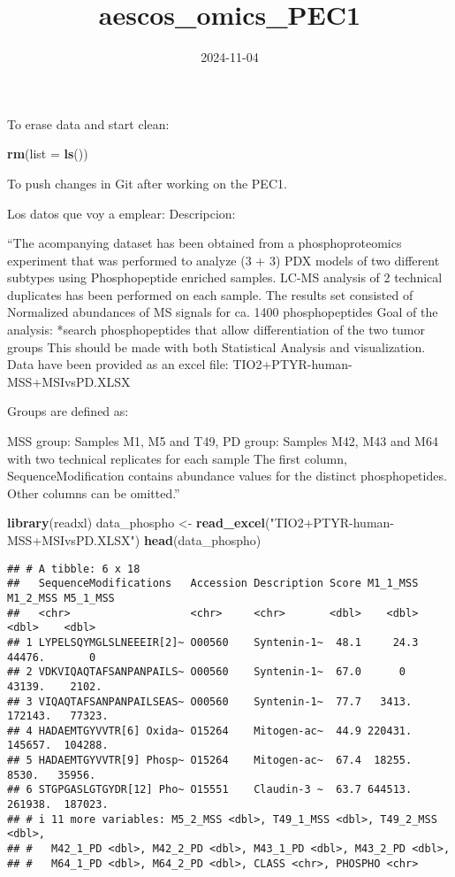 \documentclass[
]{article}
\title{aescos\_omics\_PEC1}
\author{}
\date{\vspace{-2.5em}2024-11-04}
\newenvironment{Shaded}{\begin{snugshade}}{\end{snugshade}}
\newcommand{\AttributeTok}[1]{\textcolor[rgb]{0.13,0.29,0.53}{#1}}
\newcommand{\FunctionTok}[1]{\textcolor[rgb]{0.13,0.29,0.53}{\textbf{#1}}}
\newcommand{\NormalTok}[1]{#1}
\newcommand{\OtherTok}[1]{\textcolor[rgb]{0.56,0.35,0.01}{#1}}
\newcommand{\StringTok}[1]{\textcolor[rgb]{0.31,0.60,0.02}{#1}}
\begin{document}
\maketitle

To erase data and start clean:

\begin{Shaded}
\begin{Highlighting}[]
\FunctionTok{rm}\NormalTok{(}\AttributeTok{list =} \FunctionTok{ls}\NormalTok{())}
\end{Highlighting}
\end{Shaded}

To push changes in Git after working on the PEC1.

Los datos que voy a emplear: Descripcion:

``The acompanying dataset has been obtained from a phosphoproteomics
experiment that was performed to analyze (3 + 3) PDX models of two
different subtypes using Phosphopeptide enriched samples. LC-MS analysis
of 2 technical duplicates has been performed on each sample. The results
set consisted of Normalized abundances of MS signals for ca. 1400
phosphopeptides Goal of the analysis: *search phosphopeptides that allow
differentiation of the two tumor groups This should be made with both
Statistical Analysis and visualization. Data have been provided as an
excel file: TIO2+PTYR-human-MSS+MSIvsPD.XLSX

Groups are defined as:

MSS group: Samples M1, M5 and T49, PD group: Samples M42, M43 and M64
with two technical replicates for each sample The first column,
SequenceModification contains abundance values for the distinct
phosphopetides. Other columns can be omitted.''

\begin{Shaded}
\begin{Highlighting}[]
\FunctionTok{library}\NormalTok{(readxl)}
\NormalTok{data\_phospho }\OtherTok{\textless{}{-}} \FunctionTok{read\_excel}\NormalTok{(}\StringTok{"TIO2+PTYR{-}human{-}MSS+MSIvsPD.XLSX"}\NormalTok{)}
\FunctionTok{head}\NormalTok{(data\_phospho)}
\end{Highlighting}
\end{Shaded}

\begin{verbatim}
## # A tibble: 6 x 18
##   SequenceModifications   Accession Description Score M1_1_MSS M1_2_MSS M5_1_MSS
##   <chr>                   <chr>     <chr>       <dbl>    <dbl>    <dbl>    <dbl>
## 1 LYPELSQYMGLSLNEEEIR[2]~ O00560    Syntenin-1~  48.1     24.3   44476.       0 
## 2 VDKVIQAQTAFSANPANPAILS~ O00560    Syntenin-1~  67.0      0     43139.    2102.
## 3 VIQAQTAFSANPANPAILSEAS~ O00560    Syntenin-1~  77.7   3413.   172143.   77323.
## 4 HADAEMTGYVVTR[6] Oxida~ O15264    Mitogen-ac~  44.9 220431.   145657.  104288.
## 5 HADAEMTGYVVTR[9] Phosp~ O15264    Mitogen-ac~  67.4  18255.     8530.   35956.
## 6 STGPGASLGTGYDR[12] Pho~ O15551    Claudin-3 ~  63.7 644513.   261938.  187023.
## # i 11 more variables: M5_2_MSS <dbl>, T49_1_MSS <dbl>, T49_2_MSS <dbl>,
## #   M42_1_PD <dbl>, M42_2_PD <dbl>, M43_1_PD <dbl>, M43_2_PD <dbl>,
## #   M64_1_PD <dbl>, M64_2_PD <dbl>, CLASS <chr>, PHOSPHO <chr>
\end{verbatim}
\end{document}
